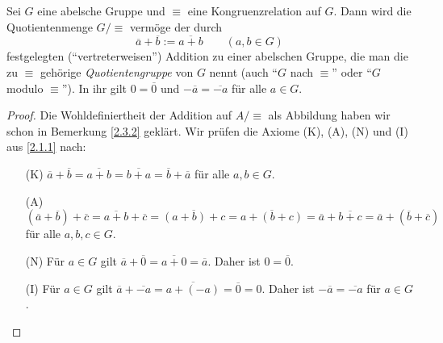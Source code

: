 \documentclass[../../main.tex]{subfiles}
\begin{document}
\begin{satdef}\label{2.3.3}
Sei $G$ eine abelsche Gruppe und $\equiv$ eine Kongruenzrelation auf $G$. Dann wird die Quotientenmenge $G/\mbox{$\equiv$}$ vermöge der durch
$$\overline a+\overline b:=\overline{a+b}\qquad(a,b\in G)$$
festgelegten ("`vertreterweisen"') Addition zu einer abelschen Gruppe, die man die zu $\equiv$ gehörige \emph{Quotientengruppe} von $G$
nennt (auch "`$G$ nach $\equiv$"' oder "`$G$ modulo $\equiv$"'). In ihr gilt $0=\overline0$ und $-\overline a=\overline{-a}$ für alle $a\in G$.
\end{satdef}
\begin{proof}
Die Wohldefiniertheit der Addition auf $A/\mbox{$\equiv$}$ als Abbildung haben wir schon in Bemerkung \ref{2.3.2} geklärt. Wir prüfen die Axiome (K), (A), (N) und (I) aus
\ref{2.1.1} nach:
\begin{enumerate}
\item[(K)] $\overline a+\overline b=\overline{a+b}=\overline{b+a}=\overline b+\overline a$ für alle $a,b\in G$.
\item[(A)]  $(\overline a+\overline b)+\overline c=\overline{a+b}+\overline c=\overline{(a+b)+c}=\overline{a+(b+c)}=\overline a+\overline{b+c}=
\overline a+(\overline b+\overline c)$ für alle $a,b,c\in G$.
\item[(N)] Für $a\in G$ gilt $\overline a+\overline0=\overline{a+0}=\overline a$. Daher ist $0=\overline 0$.
\item[(I)] Für $a\in G$ gilt $\overline a+\overline{-a}=\overline{a+(-a)}=\overline0=0$. Daher ist $-\overline a=\overline{-a}$ für $a\in G$.
\end{enumerate}
\end{proof}
\end{document}
